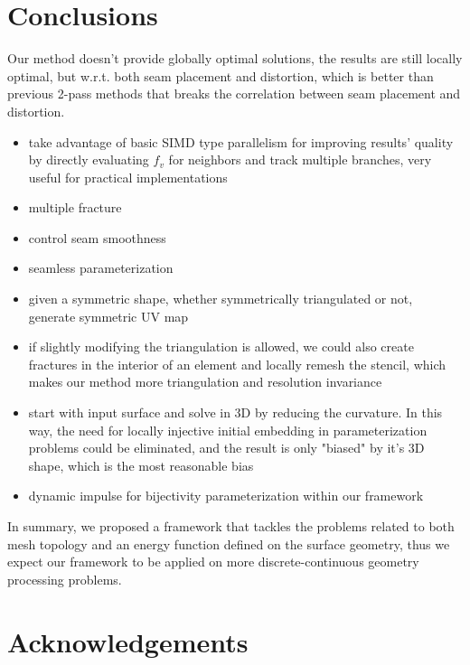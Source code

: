 
\section{Conclusions}
\label{sec:conclusion}

Our method doesn't provide globally optimal solutions, the results are still locally optimal, but w.r.t. both seam placement and distortion, which is better than previous 2-pass methods that breaks the correlation between seam placement and distortion.

\begin{itemize}
\item take advantage of basic SIMD type parallelism for improving results' quality by directly evaluating $f_v$ for neighbors and track multiple branches, very useful for practical implementations
\item multiple fracture
\item control seam smoothness
\item seamless parameterization
\item given a symmetric shape, whether symmetrically triangulated or not, generate symmetric UV map
\item if slightly modifying the triangulation is allowed, we could also create fractures in the interior of an element and locally remesh the stencil, which makes our method more triangulation and resolution invariance
\item start with input surface and solve in 3D by reducing the curvature. In this way, the need for locally injective initial embedding in parameterization problems could be eliminated, and the result is only "biased" by it's 3D shape, which is the most reasonable bias
\item dynamic impulse for bijectivity parameterization within our framework
\end{itemize}

In summary, we proposed a framework that tackles the problems related to both mesh topology and an energy function defined on the surface geometry, thus we expect our framework to be applied on more discrete-continuous geometry processing problems.

\section*{Acknowledgements} 